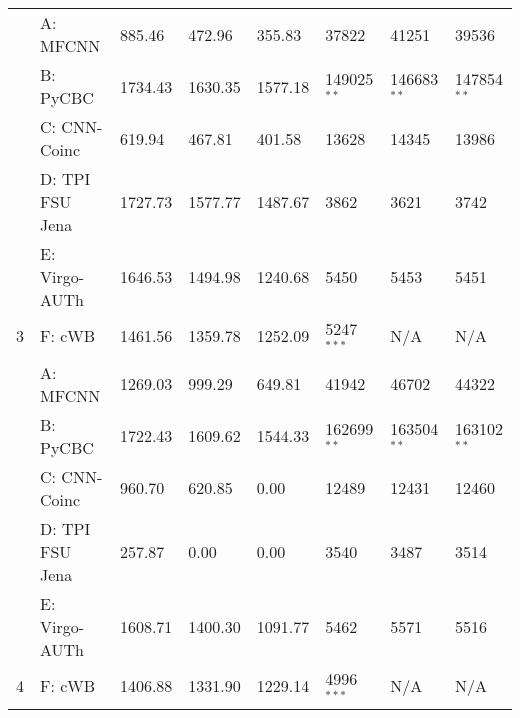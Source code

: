 \begin{tabularx}{0.98\textwidth}{|X|X|X|X|X|X|X|X|}
    \hline
    \cellcolor{Gray} &  A: MFCNN &  885.46 &  472.96 &  355.83 &  37822 &  41251 &  39536 \\
    \cellcolor{Gray} & \cellcolor{Gray}B: PyCBC & \cellcolor{Gray}1734.43 & \cellcolor{Gray}1630.35 & \cellcolor{Gray}1577.18 & \cellcolor{Gray}149025$^{\ast\ast}$ & \cellcolor{Gray}146683$^{\ast\ast}$ & \cellcolor{Gray}147854$^{\ast\ast}$ \\
    \cellcolor{Gray} &  C: CNN-Coinc &  619.94 &  467.81 &  401.58 &  13628 &  14345 &  13986 \\
    \cellcolor{Gray} & \cellcolor{Gray}D: TPI FSU Jena & \cellcolor{Gray}1727.73 & \cellcolor{Gray}1577.77 & \cellcolor{Gray}1487.67 & \cellcolor{Gray}3862 & \cellcolor{Gray}3621 & \cellcolor{Gray}3742 \\
    \cellcolor{Gray} &  E: Virgo-AUTh &  1646.53 &  1494.98 &  1240.68 &  5450 &  5453 &  5451 \\
    \multirow{-6}{*}{\cellcolor{Gray}3} & \cellcolor{Gray}F: cWB & \cellcolor{Gray}1461.56 & \cellcolor{Gray}1359.78 & \cellcolor{Gray}1252.09 & \cellcolor{Gray}5247$^{\ast\ast\ast}$ & \cellcolor{Gray}N/A & \cellcolor{Gray}N/A \\
    \hline
      &  A: MFCNN &  1269.03 &  999.29 &  649.81 &  41942 &  46702 &  44322 \\
      & \cellcolor{Gray}B: PyCBC & \cellcolor{Gray}1722.43 & \cellcolor{Gray}1609.62 & \cellcolor{Gray}1544.33 & \cellcolor{Gray}162699$^{\ast\ast}$ & \cellcolor{Gray}163504$^{\ast\ast}$ & \cellcolor{Gray}163102$^{\ast\ast}$ \\
      &  C: CNN-Coinc &  960.70 &  620.85 &  0.00 &  12489 &  12431 &  12460 \\
      & \cellcolor{Gray}D: TPI FSU Jena & \cellcolor{Gray}257.87 & \cellcolor{Gray}0.00 & \cellcolor{Gray}0.00 & \cellcolor{Gray}3540 & \cellcolor{Gray}3487 & \cellcolor{Gray}3514 \\
      &  E: Virgo-AUTh &  1608.71 &  1400.30 &  1091.77 &  5462 &  5571 &  5516 \\
    \multirow{-6}{*}{ 4} & \cellcolor{Gray}F: cWB & \cellcolor{Gray}1406.88 & \cellcolor{Gray}1331.90 & \cellcolor{Gray}1229.14 & \cellcolor{Gray}4996$^{\ast\ast\ast}$ & \cellcolor{Gray}N/A & \cellcolor{Gray}N/A \\
    \hline
\end{tabularx}
